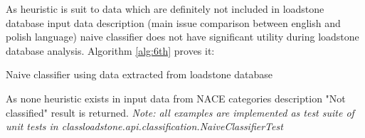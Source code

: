 As heuristic is suit to data which are definitely not included in loadstone database input data description (main issue comparison between english and polish language) naive classifier does not have significant utility during loadstone database analysis. Algorithm \ref{alg:6th} proves it:
\begin{algorithm}
	\hfill \break
	\caption{Naive classifier using data extracted from loadstone database}\label{alg:5th}
\end{algorithm}
\newline  
As none heuristic exists in input data from NACE categories description "Not classified" result is returned.
\newline
\textit{Note: all examples are implemented as test suite of unit tests in class\newline loadstone.api.classification.NaiveClassifierTest}    

